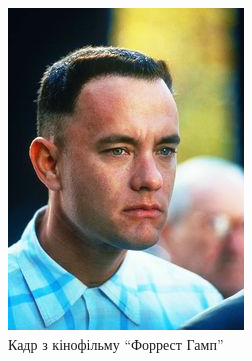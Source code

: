 \begin{figure}[h]
  \centering
  \begin{subfigure}[b]{0.3\textwidth}
    \centering
    \includegraphics[width=\textwidth]{images/forrest-gump}
    \caption{Кадр з кінофільму ``Форрест Гамп''}
    \label{fig:bfm:forrest-gump}
  \end{subfigure}
  \begin{subfigure}[b]{0.3\textwidth}
    \centering

\end{subfigure}
\end{figure}

